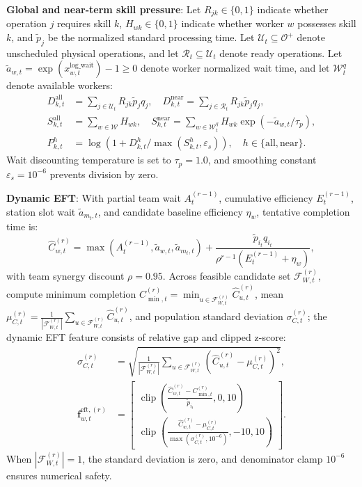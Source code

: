 \documentclass[journal,10pt]{IEEEtran}
\begin{document}
\textbf{Global and near-term skill pressure}:
Let $R_{jk}\in\{0,1\}$ indicate whether operation $j$ requires skill $k$, $H_{wk}\in\{0,1\}$ indicate whether worker $w$ possesses skill $k$, and $\widetilde p_j$ be the normalized standard processing time. Let $\mathcal U_t\subseteq\mathcal O^+$ denote unscheduled physical operations, and let $\mathcal R_t\subseteq\mathcal U_t$ denote ready operations. Let $\widetilde a_{w,t} = \exp(x_{w,t}^{\mathrm{log\_wait}}) - 1 \ge 0$ denote worker normalized wait time, and let $\mathcal W_t^q$ denote available workers:
\begin{align}
D_{k,t}^{\mathrm{all}} &= \sum_{j\in\mathcal U_t} R_{jk}\widetilde p_j q_j, \quad D_{k,t}^{\mathrm{near}} = \sum_{j\in\mathcal R_t} R_{jk}\widetilde p_j q_j, \\
S_{k,t}^{\mathrm{all}} &= \sum_{w\in\mathcal W} H_{wk}, \quad S_{k,t}^{\mathrm{near}} = \sum_{w\in\mathcal W_t^q} H_{wk}\exp(-\widetilde a_{w,t}/\tau_p), \\
P_{k,t}^h &= \log\left(1 + D_{k,t}^h/\max(S_{k,t}^h, \varepsilon_s)\right), \quad h \in\{\mathrm{all},\mathrm{near}\}.
\end{align}
Wait discounting temperature is set to $\tau_p=1.0$, and smoothing constant $\varepsilon_s=10^{-6}$ prevents division by zero.

\textbf{Dynamic EFT}:
With partial team wait $A_t^{(r-1)}$, cumulative efficiency $E_t^{(r-1)}$, station slot wait $\widetilde a_{m_t,t}$, and candidate baseline efficiency $\eta_w$, tentative completion time is:
\begin{equation}
\widehat C_{w,t}^{(r)} = \max\!\left(A_t^{(r-1)}, \widetilde a_{w,t}, \widetilde a_{m_t,t}\right) + \frac{\widetilde p_{i_t}q_{i_t}}{\rho^{r-1}(E_t^{(r-1)}+\eta_w)},
\end{equation}
with team synergy discount $\rho=0.95$. Across feasible candidate set $\mathcal F_{W,t}^{(r)}$, compute minimum completion $C_{\min,t}^{(r)}=\min_{u\in\mathcal F_{W,t}^{(r)}}\widehat C_{u,t}^{(r)}$, mean $\mu_{C,t}^{(r)}=\frac{1}{|\mathcal F_{W,t}^{(r)}|}\sum_{u\in\mathcal F_{W,t}^{(r)}}\widehat C_{u,t}^{(r)}$, and population standard deviation $\sigma_{C,t}^{(r)}$; the dynamic EFT feature consists of relative gap and clipped z-score:
\begin{align}
\sigma_{C,t}^{(r)} &= \sqrt{\frac{1}{|\mathcal F_{W,t}^{(r)}|} \sum_{u\in\mathcal F_{W,t}^{(r)}} \left(\widehat C_{u,t}^{(r)}-\mu_{C,t}^{(r)}\right)^2}, \\
\mathbf f_{w,t}^{\mathrm{eft},(r)} &= \begin{bmatrix}
\operatorname{clip}\left(\frac{\widehat C_{w,t}^{(r)}-C_{\min,t}^{(r)}}{\widetilde p_{i_t}}, 0, 10\right) \\[4pt]
\operatorname{clip}\left(\frac{\widehat C_{w,t}^{(r)}-\mu_{C,t}^{(r)}}{\max(\sigma_{C,t}^{(r)}, 10^{-6})}, -10, 10\right)
\end{bmatrix}.
\end{align}
When $|\mathcal F_{W,t}^{(r)}|=1$, the standard deviation is zero, and denominator clamp $10^{-6}$ ensures numerical safety.
\end{document}
